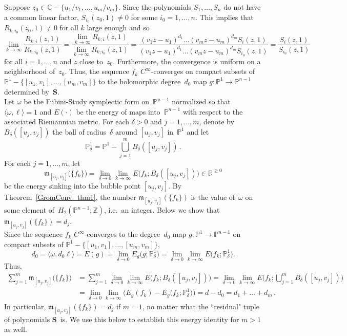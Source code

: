 \documentclass[11pt]{article}
\numberwithin{equation}{section}
\theoremstyle{definition}
\def\lr#1{\langle#1\rangle}
\def\lra{\longrightarrow}
\def\C{\mathbb{C}}
\def\fm{\mathfrak m}
\def\P{\mathbb{P}}
\def\R{\mathbb R}
\def\bS{\mathbf S}
\def\Z{{\mathbb Z}}
\def\de{\delta}
\def\om{\omega}
\def\i{\infty}
\begin{document}
\vspace{.1in}

\noindent
Suppose $z_0\!\in\!\C\!-\!\{u_1/v_1,\ldots,u_m/v_m\}$.
Since the polynomials $S_1,\ldots,S_n$ do not have a common linear factor,
$S_{i_0}(z_0,1)\!\neq\!0$ for some $i_0\!=\!1,\ldots,n$.
This implies that $R_{k;i_0}(z_0,1)\!\neq\!0$ for all $k$ large enough and so
$$\lim_{k\lra\i}\frac{R_{k;i}(z,1)}{R_{k;i_0}(z,1)}
=\frac{\lim\limits_{k\lra\i}R_{k;i}(z,1)}{\lim\limits_{k\lra\i}R_{k;i_0}(z,1)}
=\frac{(v_1z\!-\!u_1)^{d_1}\ldots(v_mz\!-\!u_m)^{d_m}S_i(z,1)}
{(v_1z\!-\!u_1)^{d_1}\ldots(v_mz\!-\!u_m)^{d_m}S_{i_0}(z,1)}
=\frac{S_i(z,1)}{S_{i_0}(z,1)}\,$$
for all $i\!=\!1,\ldots,n$ and $z$ close to~$z_0$.
Furthermore, the convergence is uniform on a neighborhood of~$z_0$.
Thus, the sequence $f_k$ $C^{\i}$-converges on compact subsets of 
$\P^1\!-\!\{[u_1,v_1],\ldots,[u_m,v_m]\}$ to 
the holomorphic degree~$d_0$ map $g\!:\P^1\!\lra\!\P^{n-1}$ determined by~$\bS$.\\

\noindent
Let $\om$ be the Fubini-Study symplectic form on~$\P^{n-1}$ normalized so that $\lr{\om,\ell}\!=\!1$
and $E(\cdot)$ be the energy of maps into~$\P^{n-1}$ with respect to the associated
Riemannian metric.
For each $\de\!>\!0$ and $j\!=\!1,\ldots,m$, 
denote by $B_{\de}([u_j,v_j])$ the ball of radius~$\de$ around $[u_j,v_j]$
in~$\P^1$ and let
$$\P^1_{\de}=\P^1-\bigcup_{j=1}^mB_{\de}([u_j,v_j])\,.$$
For each $j\!=\!1,\ldots,m$, let
$$\fm_{[u_j,v_j]}\big(\{f_k\}\big)=\lim_{\de\lra0}\lim_{k\lra\i}\!
E\big(f_k;B_{\de}([u_j,v_j])\big)\in\R^{\ge0}$$
be the energy sinking into the bubble point $[u_j,v_j]$.
By Theorem~\ref{GromConv_thm1}, the number $\fm_{[u_j,v_j]}(\{f_k\})$ is the value of~$\om$
on some element of~$H_2(\P^{n-1};\Z)$, i.e.~an integer. 
Below we show that $\fm_{[u_j,v_j]}(\{f_k\})\!=\!d_j$.\\

\noindent
Since the sequence $f_k$ $C^{\i}$-converges 
to the degree~$d_0$ map $g\!:\P^1\!\lra\!\P^{n-1}$  on compact subsets of 
$\P^1\!-\!\{[u_1,v_1],\ldots,[u_m,v_m]\}$,
$$d_0=\lr{\om,d_0\ell}=E(g)
=\lim_{\de\lra0}E_g\big(g;\P^1_{\de}\big)
=\lim_{\de\lra0}\lim_{k\lra\i}E\big(f_k;\P^1_{\de}\big).$$
Thus,
\begin{equation*}\begin{split}
\sum_{j=1}^m \fm_{[u_j,v_j]}\big(\{f_k\}\big)
&=\sum_{j=1}^m\lim_{\de\lra0}\lim_{k\lra\i}\!
E\big(f_k;B_{\de}([u_j,v_j])\big)
=\lim_{\de\lra0}\lim_{k\lra\i}
E\big(f_k;\bigcup_{j=1}^m\!B_{\de}([u_j,v_j])\big)\\
&=\lim_{\de\lra0}\lim_{k\lra\i\!}
\big(E_g(f_k)\!-\!E_g\big(f_k;\P^1_{\de}\big)\big)
=d-d_0=d_1+\ldots+d_m\,.
\end{split}\end{equation*}
In particular, $\fm_{[u_j,v_j]}(\{f_k\})\!=\!d_j$ if $m\!=\!1$, no matter what 
the ``residual" tuple of polynomials $\bS$~is.
We use this below to establish this energy identity for $m\!>\!1$ as well.\\
\end{document}
